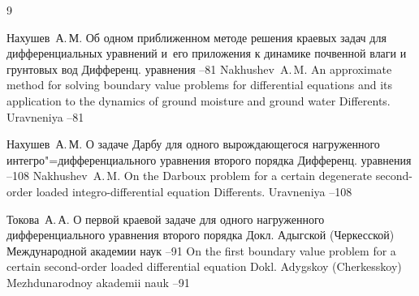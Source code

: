 \begin{thebibliography}{9}

\by Нахушев~А.\,М.
\paper Об одном приближенном методе решения краевых задач для дифференциальных уравнений и~его приложения к динамике почвенной влаги и грунтовых вод
\jour Дифференц. уравнения
--81
\misctransl
\by Nakhushev~A.\,M. 
\paper An approximate method for solving boundary value problems for differential equations and its application to the dynamics of ground moisture and ground water
\jour Differents. Uravneniya 
–81

\by Нахушев~А.\,М.
\paper О задаче Дарбу для одного вырождающегося нагруженного интегро"=дифференциального уравнения второго порядка
\jour Дифференц. уравнения
--108
\misctransl 
\by Nakhushev~A.\,M.
\paper On the Darboux problem for a certain degenerate se\-cond-or\-der loaded integro-differential equation
\jour Differents. Uravneniya 
–108


\by Токова~А.\,А.
\paper О первой краевой задаче для одного нагруженного дифференциального уравнения второго порядка
\jour Докл. Адыгской (Черкесской) Международной академии наук
--91
\misctransl
\paper On the first boundary value problem for a certain second-order loaded  differential equation
\jour Dokl. Adygskoy (Cherkesskoy) Mezhdunarodnoy akademii nauk
--91

\end{thebibliography}




\noindent
\hskip6.5cm \thedate \par\noindent
\hskip6.5cm\therevdate\par


\makeengtitlem

\renewcommand{\baselinestretch}{0.9}


\newpage

%
